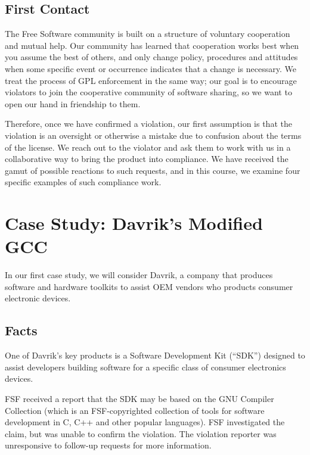 \documentclass[12pt]{report}
\begin{document}
\section{First Contact}

The Free Software community is built on a structure of voluntary
cooperation and mutual help.  Our community has learned that cooperation
works best when you assume the best of others, and only change policy,
procedures and attitudes when some specific event or occurrence indicates
that a change is necessary.  We treat the process of GPL enforcement in
the same way; our goal is to encourage violators to join the cooperative
community of software sharing, so we want to open our hand in friendship
to them.

Therefore, once we have confirmed a violation, our first assumption is
that the violation is an oversight or otherwise a mistake due to confusion
about the terms of the license.  We reach out to the violator and ask them
to work with us in a collaborative way to bring the product into
compliance.  We have received the gamut of possible reactions to such
requests, and in this course, we examine four specific examples of such
compliance work.


\chapter{Case Study: Davrik's Modified GCC}

In our first case study, we will consider Davrik, a company that produces
software and hardware toolkits to assist OEM vendors who products consumer
electronic devices.

\section{Facts}

One of Davrik's key products is a Software Development Kit (``SDK'')
designed to assist developers building software for a specific class of
consumer electronics devices.

FSF received a report that the SDK may be based on the GNU Compiler
Collection (which is an FSF-copyrighted collection of tools for software
development in C, C++ and other popular languages).  FSF investigated the
claim, but was unable to confirm the violation.  The violation reporter
was unresponsive to follow-up requests for more information.
\end{document}
